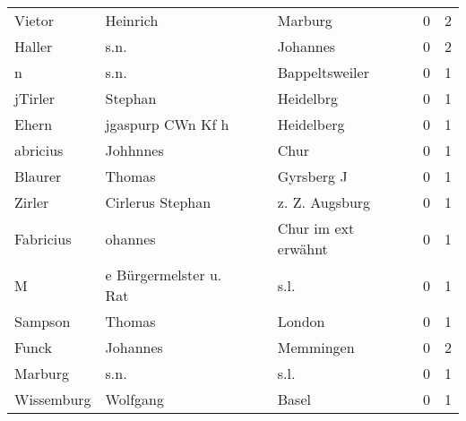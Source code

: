 \begin{center}
\begin{tiny}
\begin{longtabu}{llllrr}
                   Vietor &                           Heinrich &             &                                     Marburg &          0 &         2 \\
                   Haller &                               s.n. &             &                                    Johannes &          0 &         2 \\
                        n &                               s.n. &             &                              Bappeltsweiler &          0 &         1 \\
                  jTirler &                            Stephan &             &                                   Heidelbrg &          0 &         1 \\
                    Ehern &                  jgaspurp CWn Kf h &             &                                  Heidelberg &          0 &         1 \\
                 abricius &                           Johhnnes &             &                                        Chur &          0 &         1 \\
                  Blaurer &                             Thomas &             &                                  Gyrsberg J &          0 &         1 \\
                   Zirler &                   Cirlerus Stephan &             &                              z. Z. Augsburg &          0 &         1 \\
                Fabricius &                            ohannes &             &                         Chur im ext erwähnt &          0 &         1 \\
                        M &             e Bürgermelster u. Rat &             &                                        s.l. &          0 &         1 \\
                  Sampson &                             Thomas &             &                                      London &          0 &         1 \\
                    Funck &                           Johannes &             &                                   Memmingen &          0 &         2 \\
                  Marburg &                               s.n. &             &                                        s.l. &          0 &         1 \\
               Wissemburg &                           Wolfgang &             &                                       Basel &          0 &         1 \\

\end{longtabu}
\end{tiny}
\end{center}
